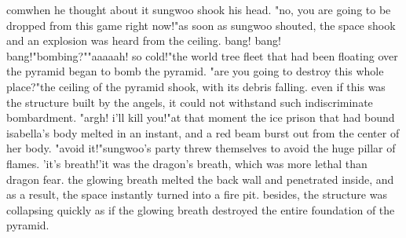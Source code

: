 comwhen he thought about it sungwoo shook his head.
"no, you are going to be dropped from this game right now!"as soon as sungwoo shouted, the space shook and an explosion was heard from the ceiling.
bang! bang! bang!"bombing?""aaaaah! so cold!"the world tree fleet that had been floating over the pyramid began to bomb the pyramid.
"are you going to destroy this whole place?"the ceiling of the pyramid shook, with its debris falling.
 even if this was the structure built by the angels, it could not withstand such indiscriminate bombardment.
"argh! i'll kill you!"at that moment the ice prison that had bound isabella's body melted in an instant, and a red beam burst out from the center of her body.
"avoid it!"sungwoo's party threw themselves to avoid the huge pillar of flames.
 'it's breath!'it was the dragon's breath, which was more lethal than dragon fear.
the glowing breath melted the back wall and penetrated inside, and as a result, the space instantly turned into a fire pit.
besides, the structure was collapsing quickly as if the glowing breath destroyed the entire foundation of the pyramid.

